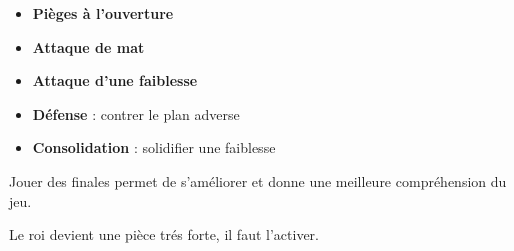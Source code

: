 
\begin{itemize}[leftmargin=2.7cm, label=, itemsep=0pt]%
\item  {\bf Pièges à l'ouverture}
\item  {\bf Attaque de mat}
\item  {\bf Attaque d'une faiblesse}
\end{itemize}

\begin{itemize}[leftmargin=2.7cm, label=, itemsep=0pt]%
\item  {\bf Défense} : contrer le plan adverse
\item  {\bf Consolidation} : solidifier une faiblesse
\end{itemize}


Jouer des finales permet de s'améliorer et donne une meilleure compréhension du jeu.

Le roi devient une pièce trés forte, il faut l'activer.

